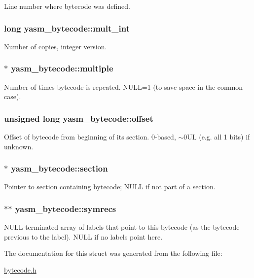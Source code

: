 Line number where bytecode was defined. \hypertarget{structyasm__bytecode_ab79d1b67e6451ec3b9d4c0f016e35cc8}{
\subsubsection[{mult\-\_\-int}]{\setlength{\rightskip}{0pt plus 5cm}long yasm\-\_\-bytecode\-::mult\-\_\-int}}\label{structyasm__bytecode_ab79d1b67e6451ec3b9d4c0f016e35cc8}
Number of copies, integer version. \hypertarget{structyasm__bytecode_a794e63656319c4ba656b384730535acc}{
\subsubsection[{multiple}]{$\ast$ yasm\-\_\-bytecode\-::multiple}}\label{structyasm__bytecode_a794e63656319c4ba656b384730535acc}
Number of times bytecode is repeated. N\-U\-L\-L=1 (to save space in the common case). \hypertarget{structyasm__bytecode_ae2a9ef5bc0ec0c1f673ee5ae145b8a97}{
\subsubsection[{offset}]{\setlength{\rightskip}{0pt plus 5cm}unsigned long yasm\-\_\-bytecode\-::offset}}\label{structyasm__bytecode_ae2a9ef5bc0ec0c1f673ee5ae145b8a97}
Offset of bytecode from beginning of its section. 0-\/based, $\sim$0\-U\-L (e.\-g. all 1 bits) if unknown. \hypertarget{structyasm__bytecode_a08e3d37c6dbd133116c18299622f782e}{
\subsubsection[{section}]{$\ast$ yasm\-\_\-bytecode\-::section}}\label{structyasm__bytecode_a08e3d37c6dbd133116c18299622f782e}
Pointer to section containing bytecode; N\-U\-L\-L if not part of a section. \hypertarget{structyasm__bytecode_a9cd95cb0279e0e9b9354b84e0b2a87d5}{
\subsubsection[{symrecs}]{$\ast$$\ast$ yasm\-\_\-bytecode\-::symrecs}}\label{structyasm__bytecode_a9cd95cb0279e0e9b9354b84e0b2a87d5}
N\-U\-L\-L-\/terminated array of labels that point to this bytecode (as the bytecode previous to the label). N\-U\-L\-L if no labels point here. 

The documentation for this struct was generated from the following file\-:\begin{DoxyCompactItemize}
\item 
\hyperlink{bytecode_8h}{bytecode.\-h}\end{DoxyCompactItemize}

